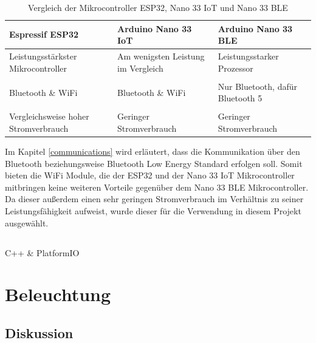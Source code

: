         \begin{table}[H]
            \caption{Vergleich der Mikrocontroller ESP32, Nano 33 IoT und Nano 33 BLE}
            \centering
            \begin{tabularx}{\textwidth}{  X | X | X  }
                \textbf{Espressif ESP32} & \textbf{Arduino Nano 33 IoT} & \textbf{Arduino Nano 33 BLE}\\ [0.5ex] \hline\hline
                Leistungsstärkster Mikrocontroller &
                Am wenigsten Leistung im Vergleich &
                Leistungsstarker Prozessor\\
                &&\\
                Bluetooth \& WiFi &
                Bluetooth \& WiFi &
                Nur Bluetooth, dafür Bluetooth 5 \\
                &&\\
                Vergleichsweise hoher Stromverbrauch &
                Geringer Stromverbrauch &
                Geringer Stromverbrauch \\
            \end{tabularx}
            \label{tab:compare_mics}
        \end{table}

        Im Kapitel \ref{communications} wird erläutert, dass die Kommunikation über den Bluetooth beziehungsweise Bluetooth Low Energy Standard erfolgen soll. Somit bieten die WiFi Module, die der ESP32 und der Nano 33 IoT Mikrocontroller mitbringen keine weiteren Vorteile gegenüber dem Nano 33 BLE Mikrocontroller. Da dieser außerdem einen sehr geringen Stromverbrauch im Verhältnis zu seiner Leistungsfähigkeit aufweist, wurde dieser für die Verwendung in diesem Projekt ausgewählt.

    \subsection{}
        C++ \& PlatformIO

\section{Beleuchtung}
    \subsection{Diskussion}

